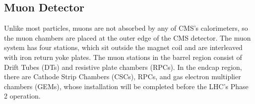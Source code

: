 \subsection{Muon Detector}
Unlike most particles, muons are not absorbed by any of CMS’s calorimeters, so the muon chambers are placed at the outer edge of the CMS detector.
The muon system has four stations, which sit outside the magnet coil and are interleaved with iron return yoke plates.
The muon stations in the barrel region consist of Drift Tubes (DTs) and resistive plate chambers (RPCs).
In the endcap region, there are Cathode Strip Chambers (CSCs), RPCs, and gas electron multiplier chambers (GEMs), whose installation will be completed before the LHC's Phase 2 operation.

